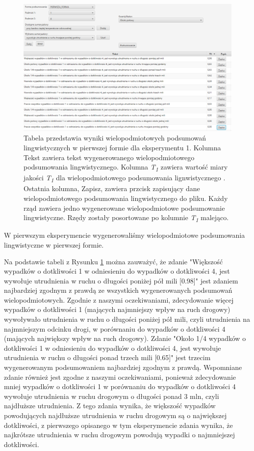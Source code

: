 \documentclass{classrep}
\begin{document}
\begin{figure}[h!]
\centering
\includegraphics[width=15cm]{ex_wiel1.png}
\vspace{-0.3cm}
\caption{Tabela przedstawia wyniki wielopodmiotowych podsumowań lingwistycznych w pierwszej formie dla eksperymentu 1. Kolumna Tekst zawiera tekst wygenerowanego wielopodmiotowego podsumowania lingwistycznego. Kolumna \textit{T\textsubscript{1}} zawiera wartość miary jakości \textit{T\textsubscript{1}} dla wielopodmiotowego podsumowania lignwistycznego \cite{niewiadomski19}. Ostatnia kolumna, Zapisz, zawiera przcisk zapisujący dane wielopodmiotowego podsumowania lingwistycznego do pliku. Każdy rząd zawiera jedno wygenerowane wielopodmiotowe podsumowanie lingwistyczne. Rzędy zostały posortowane po kolumnie \textit{T\textsubscript{1}} malejąco. }
\label{wykr_ex_wiel1}
\end{figure}
\newpage

W pierwszym eksperymencie wygenerowaliśmy wielopodmiotowe podsumowania lingwistyczne w pierwszej formie.

Na podstawie tabeli z Rysunku \ref{wykr_ex_wiel1} można zauważyć, że zdanie "Większość wypadków o dotkliwości 1 w odniesieniu do wypadków o dotkliwości 4, jest wywołuje utrudnienia w ruchu o długości poniżej pół mili [0.98]" jest zdaniem najbardziej zgodnym z prawdą ze wszystkich wygenerowanych podsumowań wielopodmiotowych. Zgodnie z naszymi oczekiwaniami, zdecydowanie więcej wypadków o dotkliwości 1 (mających najmniejszy wpływ na ruch drogowy) wywoływało utrudnienia w ruchu o długości poniżej pół mili, czyli utrudnienia na najmniejszym odcinku drogi, w porównaniu do wypadków o dotkliwości 4 (mających największy wpływ na ruch drogowy). Zdanie "Około 1/4 wypadków o dotkliwości 1 w odniesieniu do wypadków o dotkliwości 4, jest wywołuje utrudnienia w ruchu o długości ponad trzech mili [0.65]" jest trzecim wygenerowanym podsumowaniem najbardziej zgodnym z prawdą. Wspomniane zdanie również jest zgodne z naszymi oczekiwaniami, ponieważ zdecydowanie mniej wypadków o dotkliwości 1 w porównaniu do wypadków o dotkliwości 4 wywołuje utrudnienia w ruchu drogowym o długości ponad 3 mln, czyli najdłuższe utrudnienia. Z tego zdania wynika, że większość wypadków powodujących najdłuższe utrudnienia w ruchu drogowym są o największej dotkliwości, z pierwszego opisanego w tym eksperymencie zdania wynika, że najkrótsze utrudnienia w ruchu drogowym powodują wypadki o najmniejszej dotkliwości.
\end{document}
